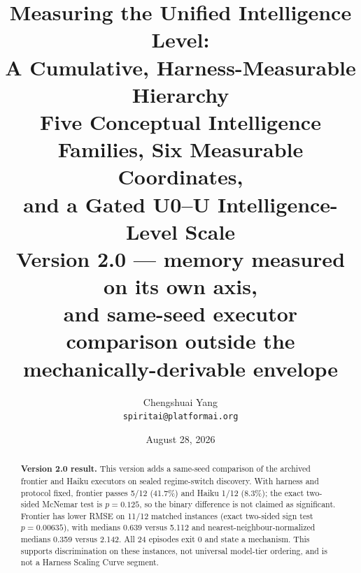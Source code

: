 \documentclass[11pt]{article}
\title{\LARGE Measuring the Unified Intelligence Level:\\[6pt]
A Cumulative, Harness-Measurable Hierarchy\\[8pt]
\large Five Conceptual Intelligence Families, Six Measurable Coordinates,\\
and a Gated U0--U\Om{} Intelligence-Level Scale\\[10pt]
\normalsize Version 2.0 --- memory measured on its own axis,\\
and same-seed executor comparison outside the mechanically-derivable envelope}
\author{Chengshuai Yang\\
\small\texttt{spiritai@platformai.org}}
\date{August 28, 2026}
\theoremstyle{definition}
\begin{document}
\maketitle

\begin{abstract}
\noindent\textbf{Version 2.0 result.} This version adds a same-seed comparison of the archived frontier and Haiku executors on sealed regime-switch discovery. With harness and protocol fixed, frontier passes 5/12 (41.7\%) and Haiku 1/12 (8.3\%); the exact two-sided McNemar test is $p=0.125$, so the binary difference is not claimed as significant. Frontier has lower RMSE on 11/12 matched instances (exact two-sided sign test $p=0.00635$), with medians 0.639 versus 5.112 and nearest-neighbour-normalized medians 0.359 versus 2.142. All 24 episodes exit 0 and state a mechanism. This supports discrimination on these instances, not universal model-tier ordering, and is not a Harness Scaling Curve segment.


\end{abstract}
\end{document}
